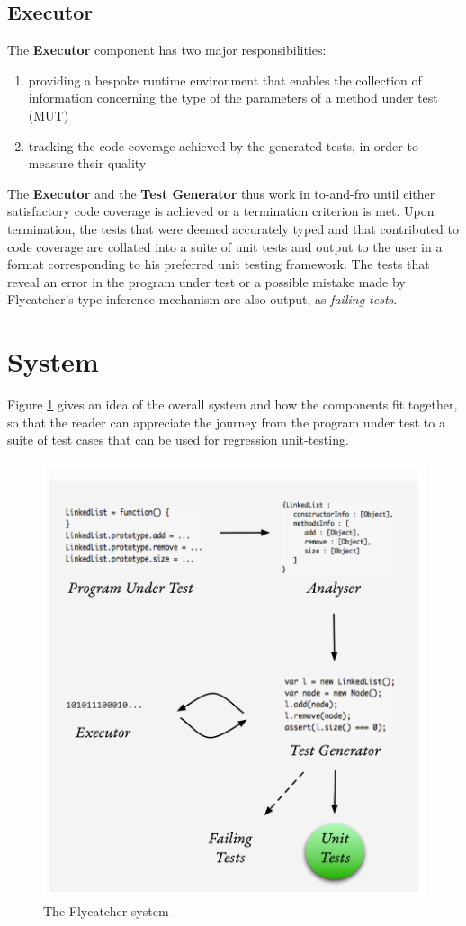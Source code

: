 \subsection{Executor}
The \textbf{Executor} component has two major responsibilities:
\begin{enumerate}
   \item providing a bespoke runtime environment that enables the collection of information concerning the type of the parameters of a method under test (MUT)
   \item tracking the code coverage achieved by the generated tests, in order to measure their quality
\end{enumerate}

The \textbf{Executor} and the \textbf{Test Generator} thus work in to-and-fro until either satisfactory code coverage is achieved or a termination criterion is met. Upon termination, the tests that were deemed accurately typed and that contributed to code coverage are collated into a suite of unit tests and output to the user in a format corresponding to his preferred unit testing framework. The tests that reveal an error in the program under test or a possible mistake made by \textsf{Flycatcher}'s type inference mechanism are also output, as \emph{failing tests}.

\section{System}
Figure \ref{system} gives an idea of the overall system and how the components fit together, so that the reader can appreciate the journey from the program under test to a suite of test cases that can be used for regression unit-testing.

\begin{figure}[h]
\hspace*{-0.3cm}
\includegraphics[scale=0.65]{./components/chapter3/system9.pdf}
\caption{The \textsf{Flycatcher} system}
\label{system}
\end{figure}